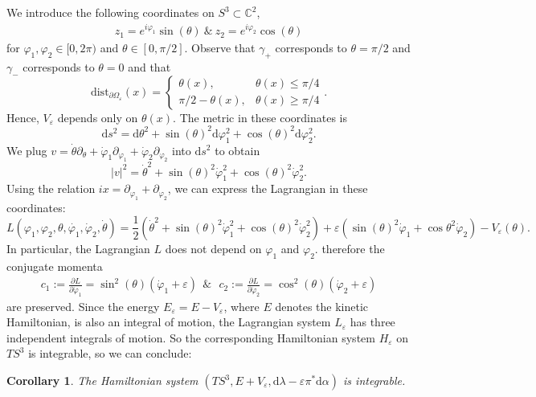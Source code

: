 \documentclass[12pt]{article}
\newtheorem{Corollary}[Definition]{Corollary}
\newcommand{\C}{\mathbb{C}} %
\newcommand{\dd}{\mathrm{d}}
\begin{document}
We introduce the following coordinates on $S^3\subset \C^2$,
\begin{align*}
    z_1=e^{i\varphi_1}\sin(\theta)\ \& \ z_2=e^{i\varphi_2}\cos(\theta)
\end{align*}
for $\varphi_1,\varphi_2\in [0,2\pi)$ and $\theta\in[0,\pi/2]$. Observe that $\gamma_+$ corresponds to $\theta=\pi/2$ and $\gamma_-$ corresponds to $\theta=0$ and that
$$
\mathrm{dist}_{\partial\Omega_{\varepsilon}}(x)=\left\{\begin{array}{ll} \theta(x), & \theta(x)\leq \pi/4 \\
\pi/2-\theta(x), & \theta(x)\geq \pi/4\end{array}\right. .
$$
Hence, $V_\varepsilon$ depends only on $\theta(x)$. The metric in these coordinates is 
$$
\dd s^2=\dd\theta^2+\sin(\theta)^2\dd\varphi_1^2+\cos(\theta)^2\dd\varphi_2^2.
$$
We plug $v=\dot \theta\partial_{\theta}+\dot\varphi_1\partial_{\varphi_1}+\dot\varphi_2\partial_{\varphi_2}$ into $\dd s^2$ to obtain
$$
\vert v\vert^2=\dot\theta^2+\sin(\theta)^2\dot\varphi_1^2+\cos(\theta)^2\dot\varphi_2^2.
$$
Using the relation \( ix = \partial_{\varphi_1} + \partial_{\varphi_2} \), we can express the Lagrangian in these coordinates: 
$$
L\left( \varphi_1, \varphi_2, \theta, \dot{\varphi_1}, \dot{\varphi}_2, \dot{\theta}\right)=\frac{1}{2}\left(\dot\theta^2+\sin(\theta)^2\dot\varphi_1^2+\cos(\theta)^2\dot\varphi_2^2\right)+\varepsilon\left(\sin(\theta)^2\dot\varphi_1+\cos{\theta}^2\dot\varphi_2\right)-V_\varepsilon(\theta).
$$
In particular, the Lagrangian $L$ does not depend on $\varphi_1$ and $\varphi_2$. therefore the conjugate momenta 
\begin{align}\label{iom}
    c_1:=\frac{\partial L}{\partial\dot\varphi_1}=\sin^2(\theta)(\dot\varphi_1+\varepsilon)\ \ \&\ \ \
    c_2:=\frac{\partial L}{\partial\dot\varphi_2}=\cos^2(\theta)(\dot\varphi_2+\varepsilon)
\end{align}
are preserved. Since the energy \( E_{\varepsilon} = E - V_{\varepsilon} \), where \( E \) denotes the kinetic Hamiltonian, is also an integral of motion, the Lagrangian system \( L_{\varepsilon} \) has three independent integrals of motion.
 So the corresponding Hamiltonian system $H_{\varepsilon}$ on $TS^{3}$ is integrable, so we can conclude: 
\begin{Corollary}
    The Hamiltonian system $\left(TS^3, E+V_\varepsilon, \dd\lambda-\varepsilon\pi^*\dd\alpha\right)$ is integrable.
\end{Corollary}
\end{document}
